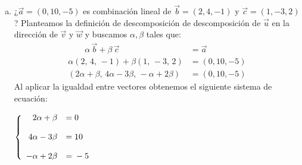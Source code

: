 \documentclass[11pt,a4paper]{article}
\newcommand{\indicador}[4]{
{\tikz[remember picture,overlay]\coordinate (#1) at #2;}{\tikz[remember picture,overlay]\coordinate (#3) at #4;} 
}
\newcommand{\marka}[2]{
{\tikz[remember picture,overlay]\coordinate (#1) at #2;}
}
\begin{document}
\begin{enumerate}[\hspace{-5mm} 1) ]
\begin{enumerate}[a)]
    \item ¿$\vec{a} = (0, 10, -5)$ es combinación lineal de $\vec{b} = (2, 4, -1)$ y $\vec{c} = (1, -3, 2)$?
Planteamos la definición de descomposición de descomposición de $\vec{u}$ en la dirección de  $\vec{v}$ y $\vec{w}$ y buscamos $\alpha, \beta$ tales que:
$$
\begin{array}{cl}
    \qquad\alpha \, \vec{b} + \beta \, \vec{c} &= \vec{a}
    \\[3mm]
    \alpha(2,\,4,\,-1) + \beta(1,\,-3,\,2) &= (0,10,-5)
    \\[3mm]
    \left( 2\alpha + \beta  ,\, 4 \alpha - 3 \beta ,\, - \alpha + 2\beta \right) &= (0,10,-5) 
\end{array}$$
Al aplicar la igualdad entre vectores obtenemos el siguiente sistema de ecuación:

\medskip 

$\left\{\begin{array}{rl}
    2\alpha + \beta &= 0  \indicador{x}{(.1,.15)}{y}{(1.3,.15)}
    \\[4mm]
    4\alpha - 3\beta &= 10 \marka{a}{(.1,.15)}
    \\[4mm]
    - \alpha + 2\beta &= \marka{xx}{(-.15,-.15)}
    -5
\end{array}\right.$




\end{enumerate}
\end{enumerate}
\end{document}
